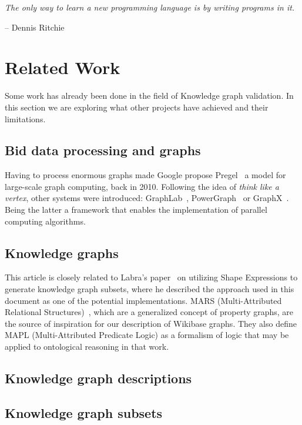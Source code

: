 \epigraph{\textit{The only way to learn a new programming language is by writing programs in it.}}{-- \textup{Dennis Ritchie}}

\section{Related Work}

Some work has already been done in the field of Knowledge graph validation. In this section we are exploring what other projects have achieved and their limitations.

\subsection{Bid data processing and graphs}

Having to process enormous graphs made Google propose Pregel~\cite{10.1145/1807167.1807184} a model for large-scale graph computing, back in 2010. Following the idea of \textit{think like a vertex}, other systems were introduced: GraphLab~\cite{10.14778/2212351.2212354}, PowerGraph~\cite{180251} or GraphX~\cite{186216}. Being the latter a framework that enables the implementation of parallel computing algorithms.

\subsection{Knowledge graphs}

This article is closely related to Labra's paper~\cite{https://doi.org/10.48550/arxiv.2110.11709} on utilizing Shape Expressions to generate knowledge graph subsets, where he described the approach used in this document as one of the potential implementations. MARS (Multi-Attributed Relational Structures)~\cite{ijcai2017p165}, which are a generalized concept of property graphs, are the source of inspiration for our description of Wikibase graphs. They also define MAPL (Multi-Attributed Predicate Logic) as a formalism of logic that may be applied to ontological reasoning in that work.

\subsection{Knowledge graph descriptions}

\subsection{Knowledge graph subsets}

